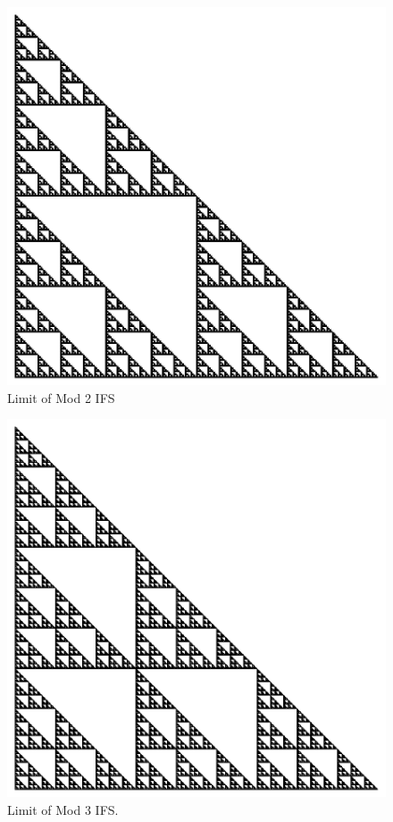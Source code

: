 \documentclass{beamer}
\begin{document}
\begin{frame}
    \begin{figure}
        \centering
        \includegraphics[scale=0.5]{GlobalMod2.pdf}
        \caption{Limit of Mod 2 IFS}
    \end{figure}
\end{frame}

\begin{frame}
    \begin{figure}
        \centering
        \includegraphics[scale=0.5]{GlobalMod3.pdf}
        \caption{Limit of Mod 3 IFS.}
    \end{figure}
\end{frame}
\end{document}
